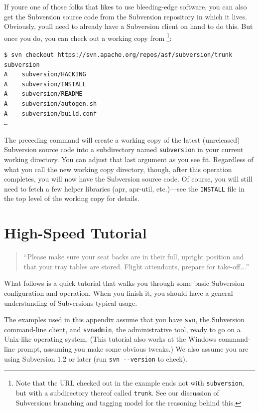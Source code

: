 If you\textquotesingle re one of those folks that likes to use
bleeding-edge software, you can also get the Subversion source code from
the Subversion repository in which it lives. Obviously,
you\textquotesingle ll need to already have a Subversion client on hand
to do this. But once you do, you can check out a working copy from
\href{https://svn.apache.org/repos/asf/subversion}{}\footnote{Note that
  the URL checked out in the example ends not with \texttt{subversion},
  but with a subdirectory thereof called \texttt{trunk}. See our
  discussion of Subversion\textquotesingle s branching and tagging model
  for the reasoning behind this.}:

\begin{verbatim}
$ svn checkout https://svn.apache.org/repos/asf/subversion/trunk subversion
A    subversion/HACKING
A    subversion/INSTALL
A    subversion/README
A    subversion/autogen.sh
A    subversion/build.conf
…
\end{verbatim}

The preceding command will create a working copy of the latest
(unreleased) Subversion source code into a subdirectory named
\texttt{subversion} in your current working directory. You can adjust
that last argument as you see fit. Regardless of what you call the new
working copy directory, though, after this operation completes, you will
now have the Subversion source code. Of course, you will still need to
fetch a few helper libraries (apr, apr-util, etc.)---see the
\texttt{INSTALL} file in the top level of the working copy for details.

\section{High-Speed Tutorial}\label{svn.intro.quickstart}

\begin{quote}
``Please make sure your seat backs are in their full, upright position
and that your tray tables are stored. Flight attendants, prepare for
take-off\ldots.''
\end{quote}

What follows is a quick tutorial that walks you through some basic
Subversion configuration and operation. When you finish it, you should
have a general understanding of Subversion\textquotesingle s typical
usage.

The examples used in this appendix assume that you have \texttt{svn},
the Subversion command-line client, and \texttt{svnadmin}, the
administrative tool, ready to go on a Unix-like operating system. (This
tutorial also works at the Windows command-line prompt, assuming you
make some obvious tweaks.) We also assume you are using Subversion 1.2
or later (run \texttt{svn\ -\/-version} to check).

